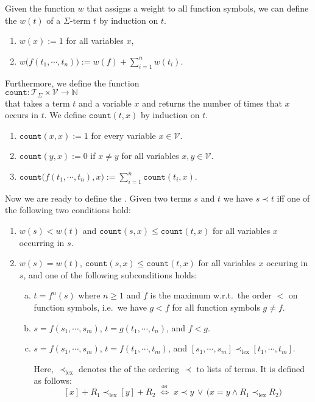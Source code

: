 Given the function $w$ that assigns a weight to all function symbols, we can define the  $w(t)$ of a
$\Sigma$-term $t$ by induction on $t$.
\begin{enumerate}
\item $w(x) := 1$ for all variables $x$,
\item $w\bigl(f(t_1,\cdots,t_n)\bigr) := w(f) + \sum\limits_{i=1}^n w(t_i)$.
\end{enumerate}
Furthermore, we define the function
\\[0.2cm]
\hspace*{1.3cm}
$\texttt{count}: \mathcal{T}_\Sigma \times \mathcal{V} \rightarrow \mathbb{N}$
\\[0.2cm]
that takes a term $t$ and a variable $x$ and returns the number of times that $x$ occurs in $t$.
We define $\texttt{count}(t,x)$ by induction on $t$.
\begin{enumerate}
\item $\texttt{count}(x, x) := 1$ for every variable $x \in \mathcal{V}$.
\item $\texttt{count}(y, x) := 0$ if $x \not= y$ for all variables $x,y \in \mathcal{V}$.
\item $\texttt{count}\bigl(f(t_1,\cdots,t_n), x\bigr) := \sum\limits_{i=1}^n \texttt{count}(t_i, x)$.
\end{enumerate}
Now we are ready to define the .  Given two terms $s$ and $t$  
we have $s \prec t$ iff one of the following two conditions hold:
\begin{enumerate}
\item $w(s) < w(t)$ and $\texttt{count}(s, x) \leq \texttt{count}(t, x)$
       for all variables $x$ occurring in  $s$.
\item $w(s) = w(t)$, $\texttt{count}(s, x) \leq \texttt{count}(t, x)$ for all variables $x$ occuring in $s$, and
      one of the following subconditions holds:
      \begin{enumerate}[(a)]
      \item $t = f^n(s)$ where $n \geq 1$ and $f$ is the maximum w.r.t.~the order $<$ on function symbols,
             i.e.~we have $g < f$ for all function symbols $g \not= f$.
      \item $s = f(s_1,\cdots,s_m)$, $t=g(t_1,\cdots,t_n)$, and $f<g$.
      \item $s = f(s_1,\cdots,s_m)$, $t=f(t_1,\cdots,t_m)$, and $[s_1,\cdots,s_m] \prec_{\textrm{lex}} [t_1,\cdots,t_m]$.
     
            Here, $\prec_{\textrm{lex}}$ denotes the  of the ordering $\prec$ to
            lists of terms.  It is defined as follows:
            $$ [x] + R_1 \prec_{\textrm{lex}} [y] + R_2 \;\stackrel{_\textrm{def}}{\Longleftrightarrow}\;
                 x \prec y \,\vee\, \bigl(x = y \wedge R_1 \prec_{\textrm{lex}} R_2\bigr)
            $$
     \end{enumerate}
\end{enumerate}

